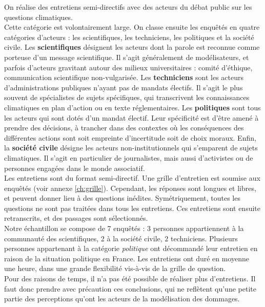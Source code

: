 \begin{methodbox}

On réalise des entretiens semi-directifs avec des acteurs du débat public sur les questions climatiques. \\

Cette catégorie est volontairement large. On classe ensuite les enquêtés en quatre catégories d'acteurs : les scientifiques, les techniciens, les politiques et la société civile. Les \textbf{scientifiques} désignent les acteurs dont la parole est reconnue comme porteuse d'un message scientifique. Il s'agit généralement de modélisateurs, et parfois d'acteurs gravitant autour des milieux universitaires : comité d'éthique, communication scientifique non-vulgarisée. Les \textbf{techniciens} sont les acteurs d'administrations publiques n'ayant pas de mandats électifs. Il s'agit le plus souvent de spécialistes de sujets spécifiques, qui transcrivent les connaissances climatiques en plan d'action ou en texte réglementaires. Les \textbf{politiques} sont tous les acteurs qui sont dotés d'un mandat électif. Leur spécificité est d'être amené à prendre des décisions, à trancher dans des contextes où les conséquences des différentes actions sont soit empreinte d'incertitude soit de choix moraux. Enfin, la \textbf{société civile} désigne les acteurs non-institutionnels qui s'emparent de sujets climatiques. Il s'agit en particulier de journalistes, mais aussi d'activistes ou de personnes engagées dans le monde associatif. \\

Les entretiens sont du format semi-directif. Une grille d'entretien est soumise aux enquêtés (voir annexe \ref{ch:grille}). Cependant, les réponses sont longues et libres, et peuvent donner lieu à des questions inédites. Symétriquement, toutes les questions ne sont pas traitées dans tous les entretiens. Ces entretiens sont ensuite retranscrits, et des passages sont sélectionnés. \\

Notre échantillon se compose de 7 enquêtés : 3 personnes appartiennent à la communauté des scientifiques, 2 à la société civile, 2 techniciens. Plusieurs personnes appartenant à la catégorie \textit{politique} ont décommandé leur entretien en raison de la situation politique en France. Les entretiens ont duré en moyenne une heure, dans une grande flexibilité vis-à-vis de la grille de question. \\

Pour des raisons de temps, il n'a pas été possible de réaliser plus d'entretiens. Il faut donc prendre avec précaution ces conclusions, qui ne reflètent qu'une petite partie des perceptions qu'ont les acteurs de la modélisation des dommages. 

\end{methodbox}



